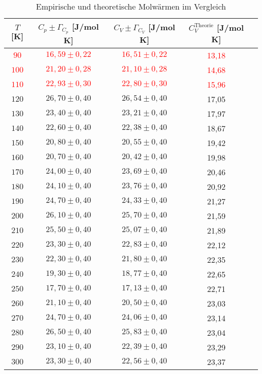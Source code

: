 \begin{table}[H]
  \centering
  \begin{tabular}{ccccc}
    \toprule
    $T$ [K] & $C_p \pm \Gamma_{C_p} $ [J/mol K]
    & $C_V \pm \Gamma_{C_V} $ [J/mol K] & $C_{V}^{\text{Theorie}}$ [J/mol K] \\
    \midrule
    \textcolor{red}{$ 90$} & \textcolor{red}{$16,59 \pm 0,22$} & \textcolor{red}{$16,51 \pm 0,22$} & \textcolor{red}{13,18} \\
    \textcolor{red}{$100$} & \textcolor{red}{$21,20 \pm 0,28$} & \textcolor{red}{$21,10 \pm 0,28$} & \textcolor{red}{14,68} \\
    \textcolor{red}{$110$} & \textcolor{red}{$22,93 \pm 0,30$} & \textcolor{red}{$22,80 \pm 0,30$} & \textcolor{red}{15,96} \\
    $120$ & $26,70 \pm 0,40$ & $26,54 \pm 0,40$ & 17,05 \\
    $130$ & $23,40 \pm 0,40$ & $23,21 \pm 0,40$ & 17,97 \\
    $140$ & $22,60 \pm 0,40$ & $22,38 \pm 0,40$ & 18,67 \\
    $150$ & $20,80 \pm 0,40$ & $20,55 \pm 0,40$ & 19,42 \\
    $160$ & $20,70 \pm 0,40$ & $20,42 \pm 0,40$ & 19,98 \\
    $170$ & $24,00 \pm 0,40$ & $23,69 \pm 0,40$ & 20,46 \\
    $180$ & $24,10 \pm 0,40$ & $23,76 \pm 0,40$ & 20,92 \\
    $190$ & $24,70 \pm 0,40$ & $24,33 \pm 0,40$ & 21,27 \\
    $200$ & $26,10 \pm 0,40$ & $25,70 \pm 0,40$ & 21,59 \\
    $210$ & $25,50 \pm 0,40$ & $25,07 \pm 0,40$ & 21,89 \\
    $220$ & $23,30 \pm 0,40$ & $22,83 \pm 0,40$ & 22,12 \\
    $230$ & $22,30 \pm 0,40$ & $21,80 \pm 0,40$ & 22,35 \\
    $240$ & $19,30 \pm 0,40$ & $18,77 \pm 0,40$ & 22,65 \\
    $250$ & $17,70 \pm 0,40$ & $17,13 \pm 0,40$ & 22,71 \\
    $260$ & $21,10 \pm 0,40$ & $20,50 \pm 0,40$ & 23,03 \\
    $270$ & $24,70 \pm 0,40$ & $24,06 \pm 0,40$ & 23,14 \\
    $280$ & $26,50 \pm 0,40$ & $25,83 \pm 0,40$ & 23,04 \\
    $290$ & $23,10 \pm 0,40$ & $22,39 \pm 0,40$ & 23,29 \\
    $300$ & $23,30 \pm 0,40$ & $22,56 \pm 0,40$ & 23,37 \\
    \bottomrule
  \end{tabular}
  \caption{Empirische und theoretische Molwärmen im Vergleich}
  \label{tab:2}
\end{table}


